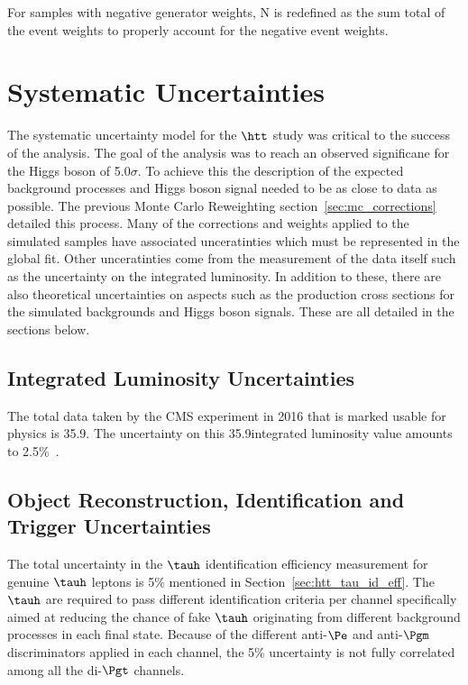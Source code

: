 For samples with negative generator weights, N is redefined as the sum total of the event weights to
properly account for the negative event weights.




\section{Systematic Uncertainties}
\label{sec:htt_systematics}

The systematic uncertainty model for the $\htt$ study was critical to the success of the analysis.
The goal of the analysis was to reach an observed significane for the Higgs boson of 5.0$\sigma$.
To achieve this the description of the expected background processes and Higgs boson signal
needed to be as close to data as possible. The previous Monte Carlo Reweighting 
section~\ref{sec:mc_corrections} detailed this process. Many of the corrections and weights applied
to the simulated samples have associated unceratinties which must be represented in the
global fit. Other unceratinties come from the measurement of the data itself such as the uncertainty
on the integrated luminosity. In addition to these, there are also theoretical uncertainties on
aspects such as the production cross sections for the simulated backgrounds and Higgs boson signals. 
These are all detailed in the sections below.


\subsection{Integrated Luminosity Uncertainties}
The total data taken by the CMS experiment in 2016 that is marked usable for physics is 35.9\fbinv. The uncertainty
on this 35.9\fbinv integrated luminosity value amounts to 2.5\%~\cite{CMS-PAS-LUM-17-001}.


\subsection{Object Reconstruction, Identification and Trigger Uncertainties}
The total uncertainty in the $\tauh$ identification efficiency measurement for genuine $\tauh$ leptons is 
5\% mentioned in Section~\ref{sec:htt_tau_id_eff}.
The $\tauh$ are required to pass different identification criteria per channel
specifically aimed at reducing the chance of fake $\tauh$ originating from different background
processes in each final state. Because of the different anti-$\Pe$ and anti-$\Pgm$ discriminators
applied in each channel, the 5\% uncertainty is not fully correlated among all the di-$\Pgt$ channels.

